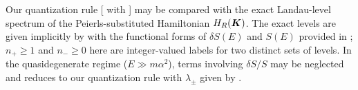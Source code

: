 \documentclass[aps, prb, showpacs, twocolumn, notitlepage, superscriptaddress]{revtex4-1}
\begin{document}


Our quantization rule [ with ] may be compared with the  exact Landau-level spectrum of the Peierls-substituted Hamiltonian $H_R(\boldsymbol{K})$. The exact levels are given implicitly by
with the functional forms of $\delta S(E)$ and $S(E)$ provided in ;  $n_{+}{\ge} 1$ and $n_-{\ge} 0$ here are integer-valued labels for two distinct sets of levels.  In the quasidegenerate regime ($E{\gg}m\alpha^2$), terms involving $\delta S/S$ may be neglected and  reduces to our quantization rule with $\lambda_{\pm}$ given by .
\end{document}
